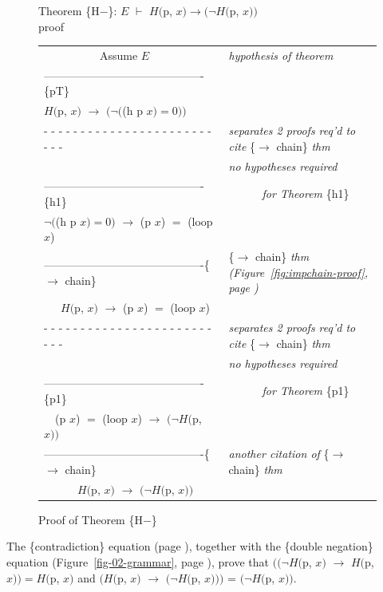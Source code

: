 \begin{figure}
Theorem \{H$-$\}: $E$ $\vdash$ $H($p, $x) \rightarrow(\neg H($p, $x))$~\\
proof
\begin{center}
\begin{tabular}{ll}
~~~~~~~~~~Assume $E$                                &\emph{hypothesis of theorem}\\
-------------------------------------------\{pT\}   &\\
$H($p, $x)$ $\rightarrow$ $(\neg($(h p $x) = 0))$   &\\
 - - - - - - - - - - - - - - - - - - - - - - - - - -&\emph{separates 2 proofs req'd to cite} \{$\rightarrow$ chain\} \emph{thm}\\
                                                    &\emph{no hypotheses required}\\
-------------------------------------------\{h1\}   &~~~~~~\emph{for Theorem} \{h1\}\\
$\neg($(h p $x)=0)$ $\rightarrow$ (p $x$) $=$ (loop $x$)&\\
-------------------------------------------\{$\rightarrow$ chain\} &\{$\rightarrow$ chain\} \emph{thm (Figure~\ref{fig:impchain-proof}, page \pageref{fig:impchain-proof})}\\
~~~$H($p, $x)$ $\rightarrow$ (p $x$) $=$ (loop $x$) &\\
 - - - - - - - - - - - - - - - - - - - - - - - - - -&\emph{separates 2 proofs req'd to cite} \{$\rightarrow$ chain\} \emph{thm}\\
                                                    &\emph{no hypotheses required}\\
-------------------------------------------\{p1\}   &~~~~~~\emph{for Theorem} \{p1\}\\
~~(p $x$) $=$ (loop $x$) $\rightarrow$ $(\neg H($p, $x))$ &\\
-------------------------------------------\{$\rightarrow$ chain\} &\emph{another citation of} \{$\rightarrow$ chain\} \emph{thm}\\
~~~~~~$H($p, $x)$ $\rightarrow$ $(\neg H($p, $x))$  &\\
\end{tabular}

\end{center}
\caption{Proof of Theorem \{H$-$\}}
\label{fig:hminus-thm-proof}
\end{figure}

The \{contradiction\} equation (page \pageref{boolean-contradiction}),
together with the \{double negation\} equation 
(Figure~\ref{fig-02-grammar}, page \pageref{fig-02-grammar}),
prove that 
$((\neg H($p, $x)$ $\rightarrow$ $H($p, $x)) = H($p, $x)$
and
$(H($p, $x)$ $\rightarrow$ $(\neg H($p, $x)))$ = $(\neg H($p, $x))$.


